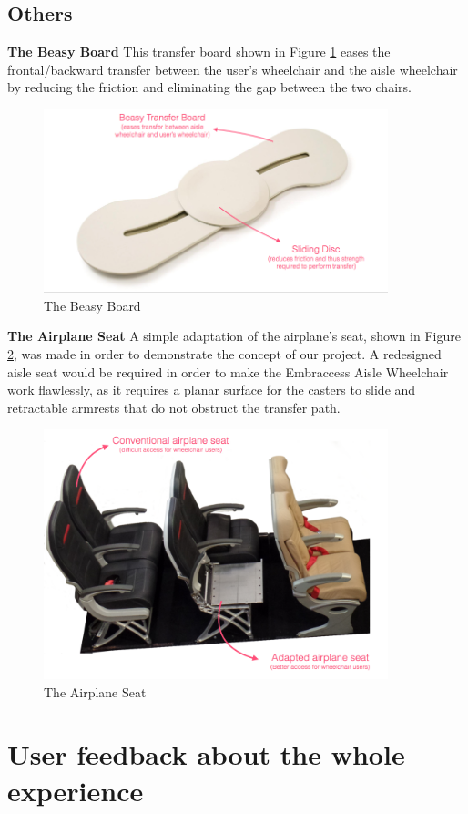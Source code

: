 \subsection{Others}
\textbf{The Beasy Board}
	This transfer board shown in Figure  \ref{fig:board} eases the frontal/backward transfer between the user's wheelchair and the aisle wheelchair by reducing the friction and eliminating the gap between the two chairs.

\begin{figure}[h]
\centering
\includegraphics[width=10cm]{images/AisleWheelchair8.png}
\caption{The Beasy Board}
\label{fig:board}
\end{figure}

\textbf{The Airplane Seat}
	A simple adaptation of the airplane's seat, shown in Figure \ref{fig:airplane}, was made in order to demonstrate the concept of our project. A redesigned aisle seat would be required in order to make the Embraccess Aisle Wheelchair work flawlessly, as it requires a planar surface for the casters to slide and retractable armrests that do not obstruct the transfer path.

\begin{figure}[h]
\centering
\includegraphics[width=10cm]{images/AisleWheelchair9.png}
\caption{The Airplane Seat}
\label{fig:airplane}
\end{figure}

\newpage

\section{User feedback about the whole experience}



